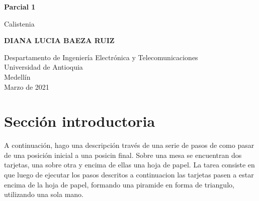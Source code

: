 \documentclass{article}
\begin{document}
\begin{titlepage}
    \begin{center}
        \vspace*{1cm}
            
        \Huge
        \textbf{Parcial 1 }
            
        \vspace{0.5cm}
        \LARGE
        Calistenia
            
        \vspace{1.5cm}
            
        \textbf{DIANA LUCIA BAEZA RUIZ}
            
        \vfill
            
        \vspace{0.8cm}
            
        \Large
        Despartamento de Ingeniería Electrónica y Telecomunicaciones\\
        Universidad de Antioquia\\
        Medellín\\
        Marzo de 2021
            
    \end{center}
\end{titlepage}

\tableofcontents
\newpage
\section{Sección introductoria}\label{intro}
A continuación, hago una descripción través de una serie de pasos de como pasar de una posición inicial a una posicin final. Sobre una mesa se encuentran dos tarjetas, una sobre otra y encima de ellas una hoja de papel. La tarea consiste en que luego de ejecutar los pasos descritos a continuacion las tarjetas pasen a estar encima de la hoja de papel, formando una piramide en forma de triangulo, utilizando una sola mano. 
\end{document}
